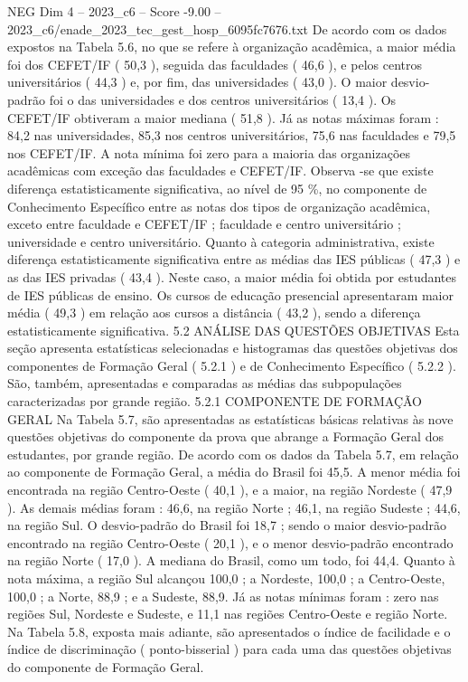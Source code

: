 \begin{textsample}{NEG Dim 4 – 2023\_c6 – Score -9.00 – 2023\_c6/enade\_2023\_tec\_gest\_hosp\_6095fc7676.txt}
De acordo com os dados expostos na Tabela 5.6, no que se refere à organização acadêmica, a maior média foi dos CEFET/IF ( 50,3 ), seguida das faculdades ( 46,6 ), e pelos centros universitários ( 44,3 ) e, por fim, das universidades ( 43,0 ).
O maior desvio-padrão foi o das universidades e dos centros universitários ( 13,4 ).
Os CEFET/IF obtiveram a maior mediana ( 51,8 ).
Já as notas máximas foram : 84,2 nas universidades, 85,3 nos centros universitários, 75,6 nas faculdades e 79,5 nos CEFET/IF.
A nota mínima foi zero para a maioria das organizações acadêmicas com exceção das faculdades e CEFET/IF.
Observa -se que existe diferença estatisticamente significativa, ao nível de 95 \%, no componente de Conhecimento Específico entre as notas dos tipos de organização acadêmica, exceto entre faculdade e CEFET/IF ; faculdade e centro universitário ; universidade e centro universitário.
Quanto à categoria administrativa, existe diferença estatisticamente significativa entre as médias das IES públicas ( 47,3 ) e as das IES privadas ( 43,4 ).
Neste caso, a maior média foi obtida por estudantes de IES públicas de ensino.
Os cursos de educação presencial apresentaram maior média ( 49,3 ) em relação aos cursos a distância ( 43,2 ), sendo a diferença estatisticamente significativa. 5.2 ANÁLISE DAS QUESTÕES OBJETIVAS Esta seção apresenta estatísticas selecionadas e histogramas das questões objetivas dos componentes de Formação Geral ( 5.2.1 ) e de Conhecimento Específico ( 5.2.2 ).
São, também, apresentadas e comparadas as médias das subpopulações caracterizadas por grande região. 5.2.1 COMPONENTE DE FORMAÇÃO GERAL Na Tabela 5.7, são apresentadas as estatísticas básicas relativas às nove questões objetivas do componente da prova que abrange a Formação Geral dos estudantes, por grande região.
De acordo com os dados da Tabela 5.7, em relação ao componente de Formação Geral, a média do Brasil foi 45,5.
A menor média foi encontrada na região Centro-Oeste ( 40,1 ), e a maior, na região Nordeste ( 47,9 ).
As demais médias foram : 46,6, na região Norte ; 46,1, na região Sudeste ; 44,6, na região Sul.
O desvio-padrão do Brasil foi 18,7 ; sendo o maior desvio-padrão encontrado na região Centro-Oeste ( 20,1 ), e o menor desvio-padrão encontrado na região Norte ( 17,0 ).
A mediana do Brasil, como um todo, foi 44,4.
Quanto à nota máxima, a região Sul alcançou 100,0 ; a Nordeste, 100,0 ; a Centro-Oeste, 100,0 ; a Norte, 88,9 ; e a Sudeste, 88,9.
Já as notas mínimas foram : zero nas regiões Sul, Nordeste e Sudeste, e 11,1 nas regiões Centro-Oeste e região Norte.
Na Tabela 5.8, exposta mais adiante, são apresentados o índice de facilidade e o índice de discriminação ( ponto-bisserial ) para cada uma das questões objetivas do componente de Formação Geral.

\end{textsample}
